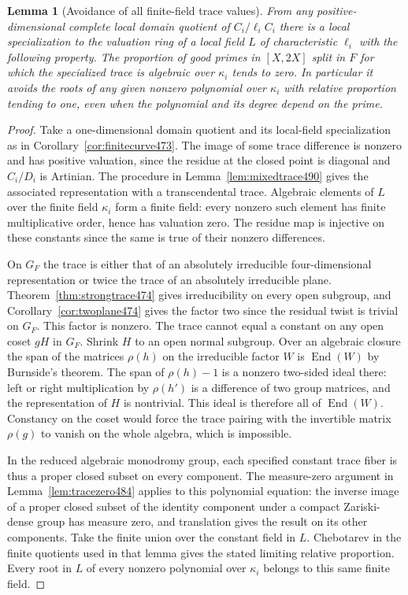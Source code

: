 \documentclass[a4paper,11pt]{article}
\newtheorem{lemma}[proposition]{Lemma}
\theoremstyle{definition}
\theoremstyle{remark}
\numberwithin{equation}{section}
\begin{document}
\begin{lemma}[Avoidance of all finite-field trace values]\leavevmode
\label{lem:constants499}
From any positive-dimensional complete local domain quotient
of \(C_i/\ell_i C_i\) there is a local specialization to the
valuation ring of a local field \(L\) of characteristic \(\ell_i\)
with the following property. The proportion of good primes
in \([X,2X]\) split in \(F\) for which the specialized trace
is algebraic over \(\kappa_i\) tends to zero. In particular it
avoids the roots of any given nonzero polynomial over
\(\kappa_i\) with relative proportion tending to one, even
when the polynomial and its degree depend on the prime.
\end{lemma}
\begin{proof}
Take a one-dimensional domain quotient and its local-field
specialization as in Corollary~\ref{cor:finitecurve473}.
The image of some trace difference is nonzero and has positive
valuation, since the residue at the closed point is diagonal
and \(C_i/D_i\) is Artinian. The procedure in
Lemma~\ref{lem:mixedtrace490} gives the associated
representation with a transcendental trace. Algebraic elements
of \(L\) over the finite field \(\kappa_i\) form a finite field:
every nonzero such element has finite multiplicative order,
hence has valuation zero. The residue map is injective on these
constants since the same is true of their nonzero differences.

On \(G_F\) the trace is either that of an absolutely irreducible
four-dimensional representation or twice the trace of an
absolutely irreducible plane. Theorem~\ref{thm:strongtrace474}
gives irreducibility on every open subgroup, and
Corollary~\ref{cor:twoplane474} gives the factor two since the
residual twist is trivial on \(G_F\). This factor is nonzero.
The trace cannot equal a constant on any open coset \(gH\)
in \(G_F\). Shrink \(H\) to an open normal subgroup. Over an
algebraic closure the span of the matrices \(\rho(h)\) on the
irreducible factor \(W\) is \(\operatorname{End}(W)\) by
Burnside's theorem. The span of \(\rho(h)-1\) is a nonzero
two-sided ideal there: left or right multiplication by
\(\rho(h')\) is a difference of two group matrices, and
the representation of \(H\) is nontrivial. This ideal is
therefore all of \(\operatorname{End}(W)\). Constancy on the
coset would force the trace pairing with the invertible matrix
\(\rho(g)\) to vanish on the whole algebra, which is impossible.

In the reduced algebraic monodromy group, each specified
constant trace fiber is thus a proper closed subset on every
component. The measure-zero argument in
Lemma~\ref{lem:tracezero484} applies to this polynomial equation:
the inverse image of a proper closed subset of the identity
component under a compact Zariski-dense group has measure zero,
and translation gives the result on its other components.
Take the finite union over the constant field in \(L\).
Chebotarev in the finite quotients used in that lemma gives
the stated limiting relative proportion. Every root in \(L\)
of every nonzero polynomial over \(\kappa_i\) belongs to this
same finite field.
\end{proof}
\end{document}
